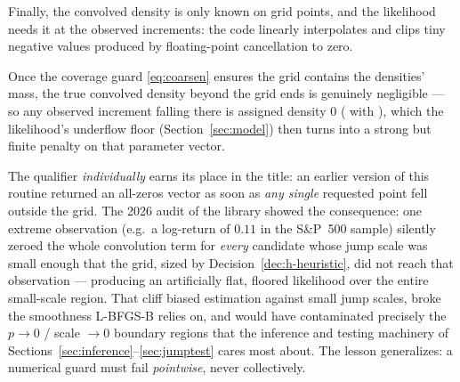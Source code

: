 Finally, the convolved density is only known on grid points, and the
likelihood needs it at the observed increments: the code linearly
interpolates and clips tiny negative values produced by floating-point
cancellation to zero.

\begin{decision}
\label{dec:out-of-grid}
Once the coverage guard \eqref{eq:coarsen} ensures the grid contains the
densities' mass, the true convolved density beyond the grid ends is
genuinely negligible --- so any observed increment falling there is
assigned density $0$ ( with ),
which the likelihood's underflow floor (Section~\ref{sec:model}) then
turns into a strong but finite penalty on that parameter vector.

The qualifier \emph{individually} earns its place in the title: an
earlier version of this routine returned an all-zeros vector as soon as
\emph{any single} requested point fell outside the grid. The 2026 audit
of the library showed the consequence: one extreme observation (e.g.\ a
log-return of $0.11$ in the S\&P~500 sample) silently zeroed the whole
convolution term for \emph{every} candidate whose jump scale was small
enough that the grid, sized by Decision~\ref{dec:h-heuristic}, did not
reach that observation --- producing an artificially flat, floored
likelihood over the entire small-scale region. That cliff biased
estimation against small jump scales, broke the smoothness L-BFGS-B
relies on, and would have contaminated precisely the
$p \to 0$ / scale $\to 0$ boundary regions that the inference and
testing machinery of Sections~\ref{sec:inference}--\ref{sec:jumptest}
cares most about. The lesson generalizes: a numerical guard must fail
\emph{pointwise}, never collectively.
\end{decision}

